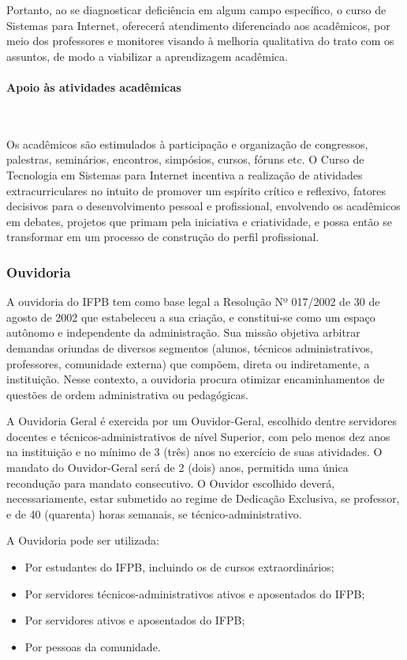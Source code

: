 Portanto, ao se diagnosticar deficiência em algum campo específico, o curso de Sistemas para Internet, oferecer\'a atendimento diferenciado aos acadêmicos, por meio dos professores e monitores visando à melhoria qualitativa do trato com os assuntos, de modo a viabilizar a aprendizagem acadêmica.

\paragraph{Apoio \`as atividades acad\^emicas}\

Os acadêmicos são estimulados \`a participação e organização de congressos, palestras, seminários, encontros, simpósios, cursos, fóruns etc. O Curso de Tecnologia em Sistemas para Internet incentiva a realização de atividades extracurriculares no intuito de promover um espírito crítico e reflexivo, fatores decisivos para o desenvolvimento pessoal e profissional, envolvendo os acadêmicos em debates, projetos que primam pela iniciativa e criatividade, e possa então se transformar em um processo de construção do perfil profissional.

\subsubsection{Ouvidoria}
       
A ouvidoria do IFPB tem como base legal a Resolução Nº 017/2002 de 30 de agosto de 2002 que estabeleceu a sua criação, e constitui-se como um espaço autônomo e independente da administração.  Sua missão objetiva arbitrar demandas oriundas de diversos segmentos (alunos, técnicos administrativos, professores, comunidade externa) que compõem, direta ou indiretamente, a instituição. Nesse contexto, a ouvidoria procura otimizar encaminhamentos de questões de ordem administrativa ou pedagógicas. 

A Ouvidoria Geral é exercida por um Ouvidor-Geral, escolhido dentre servidores docentes e técnicos-administrativos de nível Superior, com pelo menos dez anos na instituição e no mínimo de 3 (três) anos no exercício de suas atividades. O mandato do Ouvidor-Geral será de 2 (dois) anos, permitida uma única recondução para mandato consecutivo. O Ouvidor escolhido deverá, necessariamente, estar submetido ao regime de Dedicação Exclusiva, se professor, e de 40 (quarenta) horas semanais, se técnico-administrativo.

                 A Ouvidoria pode ser utilizada:

\begin{itemize}
\item Por estudantes do IFPB, incluindo os de cursos extraordinários;

\item Por servidores técnicos-administrativos ativos e aposentados do IFPB;

\item Por servidores ativos e aposentados do IFPB;

\item Por pessoas da comunidade.
\end{itemize}

